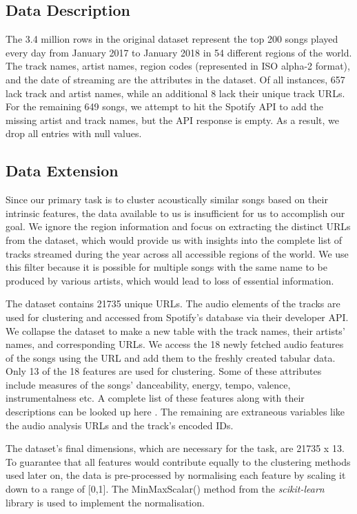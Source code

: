 \subsection{Data Description}
The 3.4 million rows in the original dataset represent the top 200 songs played every day from January 2017 to January 2018 in 54 different regions of the world. The track names, artist names, region codes (represented in ISO alpha-2 format), and the date of streaming are the attributes in the dataset. Of all instances, 657 lack track and artist names, while an additional 8 lack their unique track URLs. For the remaining 649 songs, we attempt to hit the Spotify API to add the missing artist and track names, but the API response is empty. As a result, we drop all entries with null values.

\subsection{Data Extension}
Since our primary task is to cluster acoustically similar songs based on their intrinsic features, the data available to us is insufficient for us to accomplish our goal. We ignore the region information and focus on extracting the distinct URLs from the dataset, which would provide us with insights into the complete list of tracks streamed during the year across all accessible regions of the world. We use this filter because it is possible for multiple songs with the same name to be produced by various artists, which would lead to loss of essential information. 

The dataset contains 21735 unique URLs. The audio elements of the tracks are used for clustering and accessed from Spotify's database via their developer API. We collapse the dataset to make a new table with the track names, their artists' names, and corresponding URLs. We access the 18 newly fetched audio features of the songs using the URL and add them to the freshly created tabular data. Only 13 of the 18 features are used for clustering. Some of these attributes include measures of the songs' danceability, energy, tempo, valence, instrumentalness etc. A complete list of these features along with their descriptions can be looked up here \cite{spotifyaudiofeatures}. The remaining are extraneous variables like the audio analysis URLs and the track's encoded IDs.

The dataset's final dimensions, which are necessary for the task, are 21735 x 13. To guarantee that all features would contribute equally to the clustering methods used later on, the data is pre-processed by normalising each feature by scaling it down to a range of [0,1]. The MinMaxScalar() method from the \textit{scikit-learn} library is used to implement the normalisation.